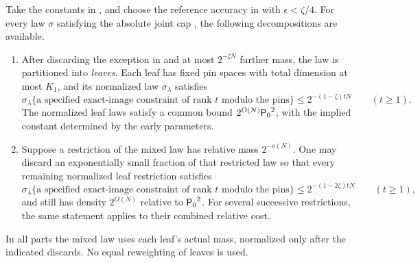 \begin{lemma}\label{lem:peeling}
Take the constants in , and choose the reference accuracy in  with \(\epsilon<\zeta/4\).
For every law \(\sigma\) satisfying the absolute joint cap , the following decompositions are available.
\begin{enumerate}[label=\textup{(\alph*)}]
\item
After discarding the exception in  and at most \(2^{-\zeta N}\) further mass, the law is partitioned into \emph{leaves}.
Each leaf has fixed pin spaces with total dimension at most \(K_1\), and its normalized law \(\sigma_\lambda\) satisfies
\begin{equation}\label{eq:leaf-minentropy}
 \sigma_\lambda\{\text{a specified exact-image constraint of rank }t
                 \text{ modulo the pins}\}
 \le 2^{-(1-\zeta)tN}
 \qquad(t\ge1).
\end{equation}
The normalized leaf laws satisfy a common bound \(2^{O(N)}{\mathsf P_0}^2\), with the implied constant determined by the early parameters.

\item
Suppose a restriction of the mixed law has relative mass \(2^{-o(N)}\).
One may discard an exponentially small fraction of that restricted law so that every remaining normalized leaf restriction satisfies
\begin{equation}\label{eq:final-leaf-minentropy}
 \sigma_\lambda\{\text{a specified exact-image constraint of rank }t
                 \text{ modulo the pins}\}
 \le 2^{-(1-2\zeta)tN}
 \qquad(t\ge1),
\end{equation}
and still has density \(2^{O(N)}\) relative to \({\mathsf P_0}^2\).
For several successive restrictions, the same statement applies to their combined relative cost.

\end{enumerate}
In all parts the mixed law uses each leaf's actual mass, normalized only after the indicated discards.
No equal reweighting of leaves is used.
\end{lemma}
